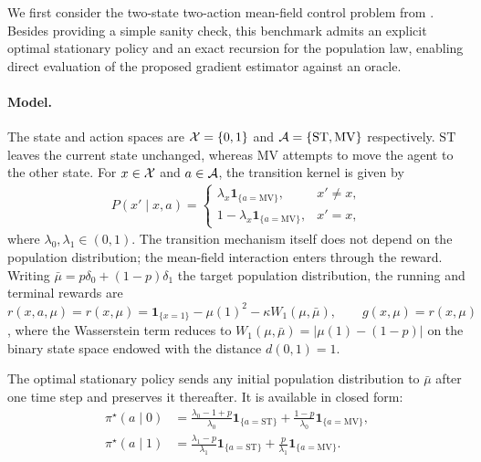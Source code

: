 We first consider the two-state two-action mean-field control problem from \cite{meunier2026model,gu2023dynamic}. Besides providing a simple sanity check, this benchmark admits an explicit optimal stationary policy and an exact recursion for the population law, enabling direct evaluation of the proposed gradient estimator against an oracle.

\paragraph{Model.}
The state and action spaces are ${\cal X}=\{0,1\}$ and ${\cal A}=\{\mathrm{ST},\mathrm{MV}\}$ respectively. $\mathrm{ST}$ leaves the current state unchanged, whereas $\mathrm{MV}$ attempts to move the agent to the other state. For $x\in{\cal X}$ and $a\in{\cal A}$, the transition kernel is given by
\begin{align}
    P(x'\mid x,a)=
    \begin{cases}
        \lambda_x\mathbf 1_{\{a=\mathrm{MV}\}},&x'\neq x, \\
        1-\lambda_x\mathbf 1_{\{a=\mathrm{MV}\}},&x'=x,
    \end{cases}
\end{align}
where $\lambda_0,\lambda_1\in(0,1)$. The transition mechanism itself does not depend on the population distribution; the mean-field interaction enters through the reward. Writing $\bar \mu=p\delta_0+(1-p)\delta_1$ the target population distribution, the running and terminal rewards are $r(x,a,\mu)=r(x,\mu)=\mathbf 1_{\{x=1\}}-\mu(1)^2-\kappa W_1(\mu,\bar\mu),\qquad g(x,\mu)=r(x,\mu)$,
where the Wasserstein term reduces to $W_1(\mu,\bar\mu)=|\mu(1)-(1-p)|$ on the binary state space endowed with the distance $d(0,1)=1$.

The optimal stationary policy sends any initial population distribution to $\bar\mu$ after one time step and preserves it thereafter. It is available in closed form:
\begin{align}
    \pi^\star(a\mid0)
    &= \frac{\lambda_0 - 1+p}{\lambda_0}\mathbf 1_{\{a=\mathrm{ST}\}} + \frac{1-p}{\lambda_0}\mathbf 1_{\{a=\mathrm{MV}\}},
    \\
    \pi^\star(a\mid 1)
    &= \frac{\lambda_1 - p}{\lambda_1}\mathbf 1_{\{a=\mathrm{ST}\}} + \frac{p}{\lambda_1}\mathbf 1_{\{a=\mathrm{MV}\}}.
\end{align}

